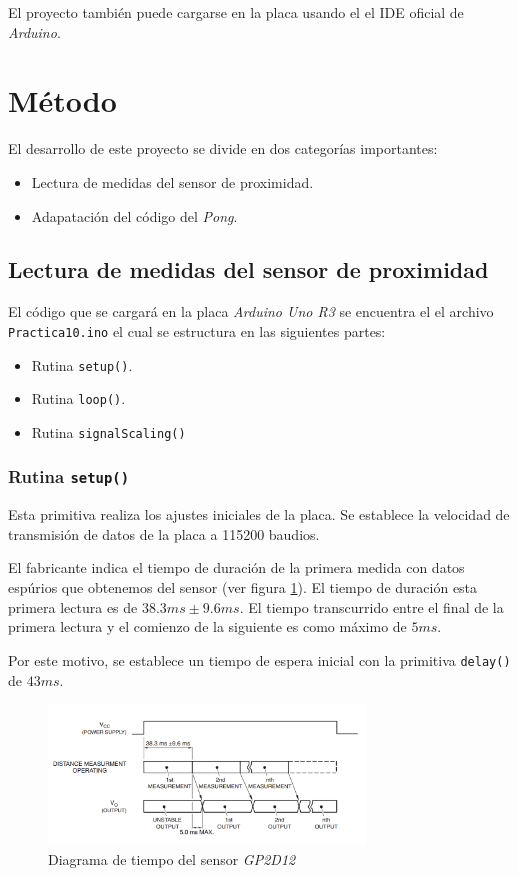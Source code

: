\documentclass[10pt,a4paper]{report}
\begin{document}
	El proyecto también puede cargarse en la placa usando el el IDE oficial de \textit{Arduino}.  
	
	\section{Método}
	El desarrollo de este proyecto se divide en dos categorías importantes:
	\begin{itemize}
		\item Lectura de medidas del sensor de proximidad.
		\item Adapatación del código del \textit{Pong}.
	\end{itemize}
	
	\subsection{Lectura de medidas del sensor de proximidad}
	El código que se cargará en la placa \textit{Arduino Uno R3} se encuentra el el archivo \texttt{Practica10.ino} el cual se estructura en las siguientes partes:
	\begin{itemize}
		\item Rutina \texttt{setup()}.
		\item Rutina \texttt{loop()}.
		\item Rutina \texttt{signalScaling()}
	\end{itemize}

	\subsubsection{Rutina \texttt{setup()}}\label{subsub:setup}
	Esta primitiva realiza los ajustes iniciales de la placa. Se establece la velocidad de transmisión de datos de la placa a 115200 baudios. 
	
	El fabricante indica el tiempo de duración de la primera medida con datos espúrios que obtenemos del sensor (ver figura \ref{fig:gp2d12-espera}). El tiempo de duración esta primera lectura es de $38.3 ms \pm 9.6ms$. El tiempo transcurrido entre el final de la primera lectura y el comienzo de la siguiente es como máximo de $5ms$.
	
	Por este motivo, se establece un tiempo de espera inicial con la primitiva \texttt{delay()} de $43ms$.
	
	
	
	\begin{figure}[H]\label{fig:gp2d12-espera}
		\centering
		\includegraphics[width=0.75\textwidth]{time-diagram.png}
		\caption{Diagrama de tiempo del sensor \textit{GP2D12}}
	\end{figure}
	
\end{document}
